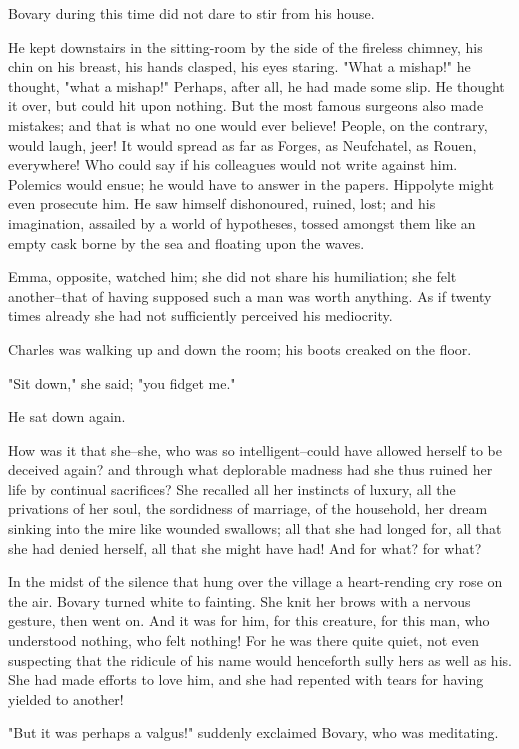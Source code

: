 \documentclass{tufte-book}
\begin{document}
Bovary during this time did not dare to stir from his house.

He kept downstairs in the sitting-room by the side of the fireless
chimney, his chin on his breast, his hands clasped, his eyes staring.
"What a mishap!" he thought, "what a mishap!" Perhaps, after all, he had
made some slip. He thought it over, but could hit upon nothing. But the
most famous surgeons also made mistakes; and that is what no one would
ever believe! People, on the contrary, would laugh, jeer! It would
spread as far as Forges, as Neufchatel, as Rouen, everywhere! Who could
say if his colleagues would not write against him. Polemics would ensue;
he would have to answer in the papers. Hippolyte might even prosecute
him. He saw himself dishonoured, ruined, lost; and his imagination,
assailed by a world of hypotheses, tossed amongst them like an empty
cask borne by the sea and floating upon the waves.

Emma, opposite, watched him; she did not share his humiliation; she felt
another--that of having supposed such a man was worth anything. As if
twenty times already she had not sufficiently perceived his mediocrity.

Charles was walking up and down the room; his boots creaked on the
floor.

"Sit down," she said; "you fidget me."

He sat down again.

How was it that she--she, who was so intelligent--could have allowed
herself to be deceived again? and through what deplorable madness had
she thus ruined her life by continual sacrifices? She recalled all her
instincts of luxury, all the privations of her soul, the sordidness of
marriage, of the household, her dream sinking into the mire like wounded
swallows; all that she had longed for, all that she had denied herself,
all that she might have had! And for what? for what?

In the midst of the silence that hung over the village a heart-rending
cry rose on the air. Bovary turned white to fainting. She knit her
brows with a nervous gesture, then went on. And it was for him, for this
creature, for this man, who understood nothing, who felt nothing! For he
was there quite quiet, not even suspecting that the ridicule of his name
would henceforth sully hers as well as his. She had made efforts to love
him, and she had repented with tears for having yielded to another!

"But it was perhaps a valgus!" suddenly exclaimed Bovary, who was
meditating.
\end{document}
